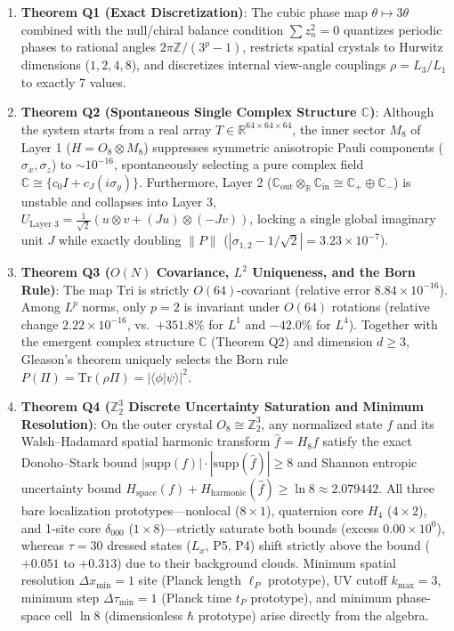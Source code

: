 \documentclass[
  a4paper,
]{article}
\providecommand{\tightlist}{%
  \setlength{\itemsep}{0pt}\setlength{\parskip}{0pt}}
\begin{document}
\begin{enumerate}
\def\labelenumi{\arabic{enumi}.}
\tightlist
\item
  \textbf{Theorem Q1 (Exact Discretization)}: The cubic phase map
  \(\theta \mapsto 3\theta\) combined with the null/chiral balance
  condition \(\sum z_n^2 = 0\) quantizes periodic phases to rational
  angles \(2\pi\mathbb{Z}/(3^p - 1)\), restricts spatial crystals to
  Hurwitz dimensions (\(1, 2, 4, 8\)), and discretizes internal
  view-angle couplings \(\rho = L_3/L_1\) to exactly 7 values.
\item
  \textbf{Theorem Q2 (Spontaneous Single Complex Structure
  \(\mathbb{C}\))}: Although the system starts from a real array
  \(T \in \mathbb{R}^{64\times 64\times 64}\), the inner sector \(M_8\)
  of Layer 1 (\(H = O_8 \otimes M_8\)) suppresses symmetric anisotropic
  Pauli components (\(\sigma_x, \sigma_z\)) to \(\sim 10^{-16}\),
  spontaneously selecting a pure complex field
  \(\mathbb{C} \cong \{c_0 I + c_J(i\sigma_y)\}\). Furthermore, Layer 2
  (\(\mathbb{C}_{\mathrm{out}} \otimes_{\mathbb{R}} \mathbb{C}_{\mathrm{in}} \cong \mathbb{C}_+ \oplus \mathbb{C}_-\))
  is unstable and collapses into Layer 3,
  \(U_{\text{Layer 3}} = \frac{1}{\sqrt{2}}(u\otimes v + (Ju)\otimes(-Jv))\),
  locking a single global imaginary unit \(J\) while exactly doubling
  \(\|P\|\) (\(|\sigma_{1,2} - 1/\sqrt{2}| = 3.23 \times 10^{-7}\)).
\item
  \textbf{Theorem Q3 (\(O(N)\) Covariance, \(L^2\) Uniqueness, and the
  Born Rule)}: The map \(\mathrm{Tri}\) is strictly \(O(64)\)-covariant
  (relative error \(8.84 \times 10^{-16}\)). Among \(L^p\) norms, only
  \(p = 2\) is invariant under \(O(64)\) rotations (relative change
  \(2.22 \times 10^{-16}\), vs.~\(+351.8\%\) for \(L^1\) and \(-42.0\%\)
  for \(L^4\)). Together with the emergent complex structure
  \(\mathbb{C}\) (Theorem Q2) and dimension \(d \ge 3\), Gleason's
  theorem uniquely selects the Born rule
  \(P(\Pi) = \mathrm{Tr}(\rho\Pi) = |\langle\phi|\psi\rangle|^2\).
\item
  \textbf{Theorem Q4 (\(\mathbb{Z}_2^3\) Discrete Uncertainty Saturation
  and Minimum Resolution)}: On the outer crystal
  \(O_8 \cong \mathbb{Z}_2^3\), any normalized state \(f\) and its
  Walsh--Hadamard spatial harmonic transform \(\hat{f} = H_8 f\) satisfy
  the exact Donoho--Stark bound
  \(|\mathrm{supp}(f)|\cdot|\mathrm{supp}(\hat{f})| \ge 8\) and Shannon
  entropic uncertainty bound
  \(H_{\mathrm{space}}(f) + H_{\mathrm{harmonic}}(\hat{f}) \ge \ln 8 \approx 2.079442\).
  All three bare localization prototypes---nonlocal (\(8\times 1\)),
  quaternion core \(H_4\) (\(4\times 2\)), and 1-site core
  \(\delta_{000}\) (\(1\times 8\))---strictly saturate both bounds
  (excess \(0.00 \times 10^0\)), whereas \(\tau = 30\) dressed states
  (\(L_x\), P5, P4) shift strictly above the bound (\(+0.051\) to
  \(+0.313\)) due to their background clouds. Minimum spatial resolution
  \(\Delta x_{\min} = 1\) site (Planck length \(\ell_P\) prototype), UV
  cutoff \(k_{\max} = 3\), minimum step \(\Delta\tau_{\min} = 1\)
  (Planck time \(t_P\) prototype), and minimum phase-space cell
  \(\ln 8\) (dimensionless \(\hbar\) prototype) arise directly from the
  algebra.
\end{enumerate}
\end{document}
